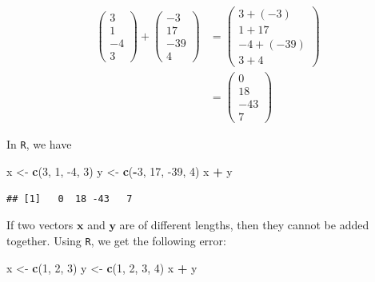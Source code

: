 \documentclass[
]{book}
\newenvironment{Shaded}{\begin{snugshade}}{\end{snugshade}}
\newcommand{\DecValTok}[1]{\textcolor[rgb]{0.00,0.00,0.81}{#1}}
\newcommand{\KeywordTok}[1]{\textcolor[rgb]{0.13,0.29,0.53}{\textbf{#1}}}
\newcommand{\NormalTok}[1]{#1}
\newcommand{\OperatorTok}[1]{\textcolor[rgb]{0.81,0.36,0.00}{\textbf{#1}}}
\newcommand{\StringTok}[1]{\textcolor[rgb]{0.31,0.60,0.02}{#1}}
\theoremstyle{definition}
\theoremstyle{definition}
\theoremstyle{definition}
\theoremstyle{remark}
\begin{document}
\[
\begin{aligned}
\begin{pmatrix} 3 \\ 1 \\ -4 \\ 3 \end{pmatrix} + \begin{pmatrix} -3 \\ 17 \\ -39 \\ 4 \end{pmatrix} & = \begin{pmatrix} 3 + (-3) \\ 1 + 17 \\ -4 + (-39) \\ 3 + 4 \end{pmatrix} \\
& = \begin{pmatrix} 0 \\ 18 \\ -43 \\ 7 \end{pmatrix} 
\end{aligned}
\]

In \texttt{R}, we have

\begin{Shaded}
\begin{Highlighting}[]
\NormalTok{x <-}\StringTok{ }\KeywordTok{c}\NormalTok{(}\DecValTok{3}\NormalTok{, }\DecValTok{1}\NormalTok{, }\DecValTok{-4}\NormalTok{, }\DecValTok{3}\NormalTok{)}
\NormalTok{y <-}\StringTok{ }\KeywordTok{c}\NormalTok{(}\OperatorTok{-}\DecValTok{3}\NormalTok{, }\DecValTok{17}\NormalTok{, }\DecValTok{-39}\NormalTok{, }\DecValTok{4}\NormalTok{)}
\NormalTok{x }\OperatorTok{+}\StringTok{ }\NormalTok{y}
\end{Highlighting}
\end{Shaded}

\begin{verbatim}
## [1]   0  18 -43   7
\end{verbatim}

If two vectors \(\mathbf{x}\) and \(\mathbf{y}\) are of different lengths, then they cannot be added together. Using \texttt{R}, we get the following error:

\begin{Shaded}
\begin{Highlighting}[]
\NormalTok{x <-}\StringTok{ }\KeywordTok{c}\NormalTok{(}\DecValTok{1}\NormalTok{, }\DecValTok{2}\NormalTok{, }\DecValTok{3}\NormalTok{)}
\NormalTok{y <-}\StringTok{ }\KeywordTok{c}\NormalTok{(}\DecValTok{1}\NormalTok{, }\DecValTok{2}\NormalTok{, }\DecValTok{3}\NormalTok{, }\DecValTok{4}\NormalTok{)}
\NormalTok{x }\OperatorTok{+}\StringTok{ }\NormalTok{y}
\end{Highlighting}
\end{Shaded}
\end{document}
